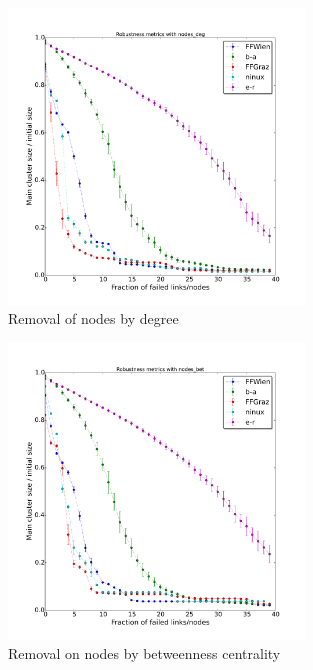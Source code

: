 \documentclass[a4paper,11pt,twoside,openright]{memoir}
\begin{document}
\begin{figure}[htbp]
\centering
\includegraphics[width=0.7\textwidth]{graphs/nodes_deg_robustness}
\caption{Removal of nodes by degree}
\label{fig:node_deg}
\end{figure}

\begin{figure}[htbp]
\centering
\includegraphics[width=0.7\textwidth]{graphs/nodes_bet_robustness}
\caption{Removal on nodes by betweenness centrality}
\label{fig:node_bet}
\end{figure}
\end{document}
